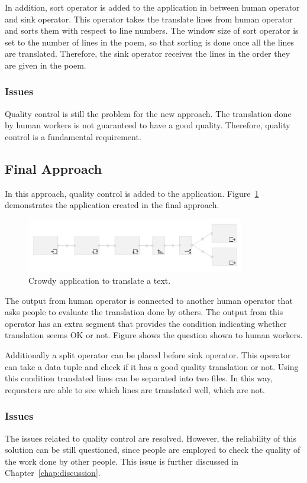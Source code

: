 In addition, sort operator is added to the application in between human operator and sink operator. This operator takes the translate lines from human operator and sorts them with respect to line numbers. The window size of sort operator is set to the number of lines in the poem, so that sorting is done once all the lines are translated. Therefore, the sink operator receives the lines in the order they are given in the poem.

\subsubsection{Issues}
Quality control is still the problem for the new approach. The translation done by human workers is not guaranteed to have a good quality. Therefore, quality control is a fundamental requirement.

\subsection{Final Approach}
In this approach, quality control is added to the application. Figure~\ref{fig:scenario2.2} demonstrates the application created in the final approach.

\begin{figure}[ht]
	\centering
	\includegraphics[width=0.85\textwidth]{figures/scenarios/scenario2_2.png}
	\caption{Crowdy application to translate a text.}
	\label{fig:scenario2.2}
\end{figure}

The output from human operator is connected to another human operator that asks people to evaluate the translation done by others. The output from this operator has an extra segment that provides the condition indicating whether translation seems OK or not. Figure shows the question shown to human workers.

Additionally a split operator can be placed before sink operator. This operator can take a data tuple and check if it has a good quality translation or not. Using this condition translated lines can be separated into two files. In this way, requesters are able to see which lines are translated well, which are not.

\subsubsection{Issues}
The issues related to quality control are resolved. However, the reliability of this solution can be still questioned, since people are employed to check the quality of the work done by other people. This issue is further discussed in Chapter~\ref{chap:discussion}.